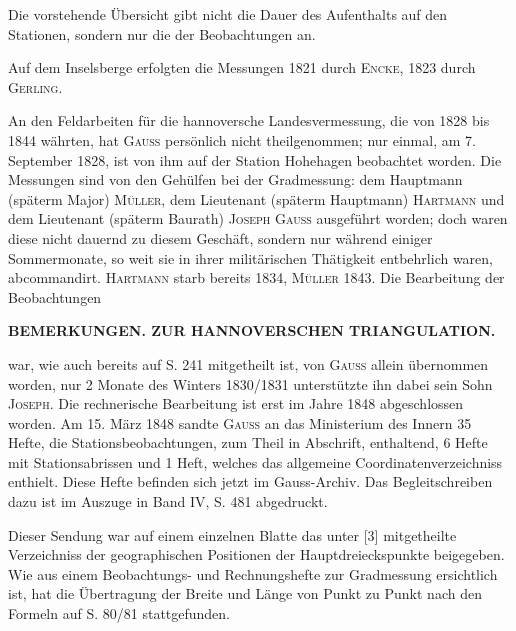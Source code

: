 \par\noindent\hspace*{\parindent}Die vorstehende Übersicht gibt nicht die Dauer des Aufenthalts auf den Stationen, sondern nur die der Beobachtungen an.

\par\noindent\hspace*{\parindent}Auf dem Inselsberge erfolgten die Messungen 1821 durch \textsc{Encke}, 1823 durch \textsc{Gerling}.

\par\noindent\hspace*{\parindent}An den Feldarbeiten für die hannoversche Landesvermessung, die von 1828 bis 1844 währten, hat \textsc{Gauss} persönlich nicht theilgenommen; nur einmal, am 7. September 1828, ist von ihm auf der Station Hohehagen beobachtet worden. Die Messungen sind von den Gehülfen bei der Gradmessung: dem Hauptmann (späterm Major) \textsc{Müller}, dem Lieutenant (späterm Hauptmann) \textsc{Hartmann} und dem Lieutenant (späterm Baurath) \textsc{Joseph Gauss} ausgeführt worden; doch waren diese nicht dauernd zu diesem Geschäft, sondern nur während einiger Sommermonate, so weit sie in ihrer militärischen Thätigkeit entbehrlich waren, abcommandirt. \textsc{Hartmann} starb bereits 1834, \textsc{Müller} 1843. Die Bearbeitung der Beobachtungen
\par\medskip\noindent{}\par

\clearpage
\noindent{}\hfill\textbf{BEMERKUNGEN. ZUR HANNOVERSCHEN TRIANGULATION.}\hfill\null\par\medskip
\noindent war, wie auch bereits auf S. 241 mitgetheilt ist, von \textsc{Gauss} allein übernommen worden, nur 2 Monate des Winters 1830/1831 unterstützte ihn dabei sein Sohn \textsc{Joseph}. Die rechnerische Bearbeitung ist erst im Jahre 1848 abgeschlossen worden. Am 15. März 1848 sandte \textsc{Gauss} an das Ministerium des Innern 35 Hefte, die Stationsbeobachtungen, zum Theil in Abschrift, enthaltend, 6 Hefte mit Stationsabrissen und 1 Heft, welches das allgemeine Coordinatenverzeichniss enthielt. Diese Hefte befinden sich jetzt im Gauss-Archiv. Das Begleitschreiben dazu ist im Auszuge in Band IV, S. 481 abgedruckt.

\par\noindent\hspace*{\parindent}Dieser Sendung war auf einem einzelnen Blatte das unter [3] mitgetheilte Verzeichniss der geographischen Positionen der Hauptdreieckspunkte beigegeben. Wie aus einem Beobachtungs- und Rechnungshefte zur Gradmessung ersichtlich ist, hat die Übertragung der Breite und Länge von Punkt zu Punkt nach den Formeln auf S. 80/81 stattgefunden.

